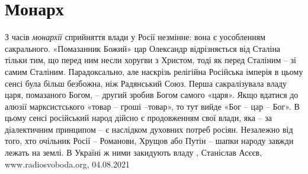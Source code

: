  
 
 
 
 
\chapter{Монарх}
\label{sec:slova.monarh}

З часів \emph{монархії} сприйняття влади у Росії незмінне: вона є уособленням
сакрального. «Помазанник Божий» цар Олександр відрізняється від Сталіна тільки
тим, що перед ним несли хоругви з Христом, тоді як перед Сталіним – зі самим
Сталіним. Парадоксально, але наскрізь релігійна Російська імперія в цьому сенсі
була більш безбожна, ніж Радянський Союз. Перша сакралізувала владу царя,
помазаного Богом, – другий зробив Богом самого «царя».  Якщо вдатися до алюзії
марксистського «товар – гроші –товар», то тут вийде «Бог – цар – Бог». В цьому
сенсі російський народ дійсно є продовженням свої влади, яка – за діалектичним
принципом – є наслідком духовних потреб росіян. Незалежно від того, хто
очільник Росії – Романови, Хрущов або Путін – шапки народу завжди лежать на
землі.  В Україні ж ними закидують владу
, 
Станіслав Асєєв, www.radiosvoboda.org, 04.08.2021
